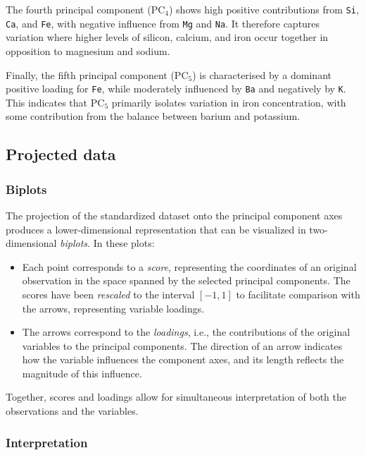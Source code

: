 \documentclass[dtu]{dtuarticle}
\begin{document}
	The fourth principal component ($\text{PC}_4$) shows high positive contributions from \texttt{Si}, \texttt{Ca}, and \texttt{Fe}, with negative influence from \texttt{Mg} and \texttt{Na}. It therefore captures variation where higher levels of silicon, calcium, and iron occur together in opposition to magnesium and sodium.

	Finally, the fifth principal component ($\text{PC}_5$) is characterised by a dominant positive loading for \texttt{Fe}, while moderately influenced by \texttt{Ba} and negatively by \texttt{K}. This indicates that $\text{PC}_5$ primarily isolates variation in iron concentration, with some contribution from the balance between barium and potassium.

	\subsection{Projected data}

	\subsubsection{Biplots}

	The projection of the standardized dataset onto the principal component axes produces a lower-dimensional representation that can be visualized in two-dimensional \textit{biplots}. In these plots:

	\begin{itemize}
		\item Each point corresponds to a \textit{score}, representing the coordinates of an original observation in the space spanned by the selected principal components. The scores have been \textit{rescaled} to the interval $[-1,1]$ to facilitate comparison with the arrows, representing variable loadings.
		\item The arrows correspond to the \textit{loadings}, i.e., the contributions of the original variables to the principal components. The direction of an arrow indicates how the variable influences the component axes, and its length reflects the magnitude of this influence.
	\end{itemize}

	Together, scores and loadings allow for simultaneous interpretation of both the observations and the variables.

	\subsubsection{Interpretation}
\end{document}
